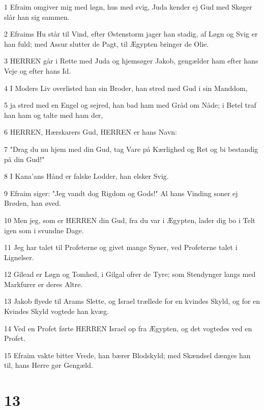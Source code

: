 \par 1 Efraim omgiver mig med løgn, hus med svig, Juda kender ej Gud med Skøger slår han sig sammen.
\par 2 Efraims Hu står til Vind, efter Østenstorm jager han stadig, af Løgn og Svig er han fuld; med Assur slutter de Pagt, til Ægypten bringer de Olie.
\par 3 HERREN går i Rette med Juda og hjemsøger Jakob, gengælder ham efter hans Veje og efter hans Id.
\par 4 I Moders Liv overlisted han sin Broder, han stred med Gud i sin Manddom,
\par 5 ja stred med en Engel og sejred, han bad ham med Gråd om Nåde; i Betel traf han ham og talte med ham der,
\par 6 HERREN, Hærskarers Gud, HERREN er hans Navn:
\par 7 "Drag du nu hjem med din Gud, tag Vare på Kærlighed og Ret og bi bestandig på din Gud!"
\par 8 I Kana'ans Hånd er falske Lodder, han elsker Svig.
\par 9 Efraim siger: "Jeg vandt dog Rigdom og Gods!" Al hans Vinding soner ej Brøden, han øved.
\par 10 Men jeg, som er HERREN din Gud, fra du var i Ægypten, lader dig bo i Telt igen som i svundne Dage.
\par 11 Jeg har talet til Profeterne og givet mange Syner, ved Profeterne talet i Lignelser.
\par 12 Gilead er Løgn og Tomhed, i Gilgal ofrer de Tyre; som Stendynger langs med Markfurer er deres Altre.
\par 13 Jakob flyede til Arams Slette, og Israel trællede for en kvindes Skyld, og for en Kvindes Skyld vogtede han kvæg.
\par 14 Ved en Profet førte HERREN Israel op fra Ægypten, og det vogtedes ved en Profet.
\par 15 Efraim vakte bitter Vrede, han bærer Blodskyld; med Skændsel dænges han til, hans Herre gør Gengæld.

\chapter{13}

